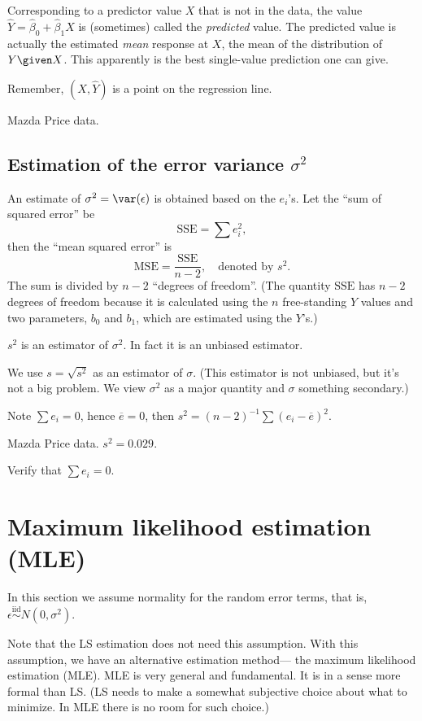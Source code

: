 \documentclass[12pt]{article}
\begin{document}
Corresponding to a predictor value $X$ that is not in the data,
the value $\hat{Y} = \hat{\beta}_0 + \hat{\beta}_1 X$
is (sometimes) called the \emph{predicted} value.
The predicted value is actually the estimated \emph{mean} response at $X$,
\ie the mean of the distribution of $Y \given X$.
This apparently is the best single-value prediction one can give.

Remember, $(X, \hat{Y})$ is a point on the regression line.


\example Mazda Price data.

\subsection{Estimation of the error variance $\sigma^2$}

An estimate of $\sigma^2 = \var(\epsilon)$ is obtained based on
the $e_i$'s. Let the ``sum of squared error'' be
\[ \text{SSE} = \sum e_i^2, \]
then the ``mean squared error'' is
\[ \text{MSE} = \frac{\text{SSE}}{n-2},
\quad\text{denoted by $s^2$}.\]
The sum is divided by $n-2$ ``degrees of freedom''.
(The quantity $\text{SSE}$ has $n-2$ degrees of freedom because
it is calculated using the $n$ free-standing $Y$ values
and two parameters, $b_0$ and $b_1$,
which are estimated using the $Y$'s.)

$s^2$ is an estimator of $\sigma^2$.
In fact it is an unbiased estimator.

We use $s = \sqrt{s^2}$ as an estimator of $\sigma$.
(This estimator is not unbiased, but it's not a big problem.
We view $\sigma^2$ as a major quantity and $\sigma$ something secondary.)

Note $\sum e_i = 0$, hence $\overline{e} = 0$,
then
$s^2 = (n-2)^{-1} \sum (e_i - \overline{e})^2$.


\example Mazda Price data. $s^2 = 0.029$.

\exercise Verify that $\sum e_i = 0$.

\section{Maximum likelihood estimation (MLE)}

In this section we assume normality for the random error terms, that is,
$\epsilon \overset{\text{iid}}{\sim} N(0, \sigma^2)$.

Note that the LS estimation does not need this assumption.
With this assumption, we have an alternative estimation method---%
the maximum likelihood estimation (MLE).
MLE is very general and fundamental.
It is in a sense more formal than LS.
(LS needs to make a somewhat subjective choice about what to minimize.
In MLE there is no room for such choice.)
\end{document}
